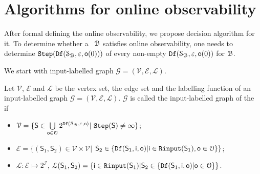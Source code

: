 
\section{Algorithms for online observability}
\label{sec:deter}
After formal defining the online observability, we propose decision algorithm for it. To determine whether a \BCN\ ${\mathcal{B}}$ satisfies online observability, one needs to determine ${\tt Step}({\tt Df}(\mathcal{S}_{\mathcal{B}},\varepsilon,\mathsf{o}(0)))$ of every non-empty ${\tt Df}(\mathcal{S}_{\mathcal{B}},\varepsilon, \mathsf{o}(0))$ for ${\mathcal{B}}$. 

We start with input-labelled graph $\mathcal{G}=(\mathcal{V}, \mathcal{E}, \mathcal{L})$.

\begin{definition}
Let $\mathcal{V}$, $\mathcal{E}$ and $\mathcal{L}$ be the vertex set, the edge set and the labelling function of an input-labelled graph $\mathcal{G}=(\mathcal{V}, \mathcal{E}, \mathcal{L})$. $\mathcal{G}$ is called the input-labelled graph of the \BCN\, if 
\begin{itemize}
\item  $\mathcal{V}=\{\mathsf{S}\in\bigcup\limits_{\mathsf{o}\in\mathcal{O}} 2^{{\tt Df}(\mathcal{S}_{\mathcal{B}},\varepsilon,\mathsf{o} )}|\ {\tt Step}(\mathsf{S})\ne \infty\}$;
\item  $\mathcal{E}=\{(\mathsf{S}_1,\mathsf{S}_2)\in \mathcal{V}\times \mathcal{V}|$ $\mathsf{S}_2\in\{{\tt Df}(\mathsf{S}_1,\mathsf{i},\mathsf{o})|\mathsf{i}\in{\tt Rinput}(\mathsf{S}_1),\mathsf{o}\in  \mathcal{O}\}\}$;
\item  $\mathcal{L}:\mathcal{E}\mapsto 2^{\mathcal{I}}$, $\mathcal{L}(\mathsf{S}_1,\mathsf{S}_2)=\{\mathsf{i}\in {\tt Rinput}(\mathsf{S}_1)|\mathsf{S}_2\in\{{\tt Df}(\mathsf{S}_1,\mathsf{i},\mathsf{o})|\mathsf{o}\in  \mathcal{O}\}\}$.
 \end{itemize}
\end{definition}

